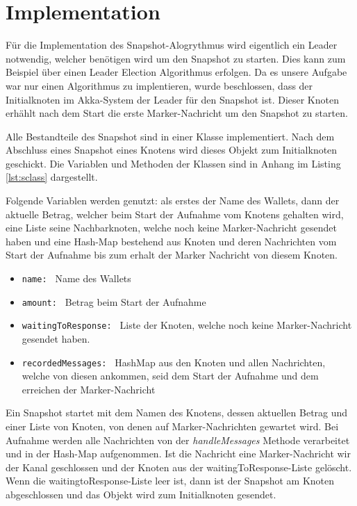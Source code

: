 \section{Implementation}
\label{sec:impl}
Für die Implementation des Snapshot-Alogrythmus wird eigentlich ein Leader 
notwendig, welcher benötigen wird um den Snapshot zu starten. Dies kann zum
Beispiel über einen Leader Election Algorithmus erfolgen. Da es unsere Aufgabe
war nur einen Algorithmus zu implentieren, wurde beschlossen, dass der 
Initialknoten im Akka-System der Leader für den Snapshot ist. Dieser Knoten 
erhählt nach dem Start die erste Marker-Nachricht um den Snapshot zu starten.

Alle Bestandteile des Snapshot sind in einer Klasse implementiert. Nach dem
Abschluss eines Snapshot eines Knotens wird dieses Objekt zum Initialknoten
geschickt.
Die Variablen und Methoden der Klassen sind in Anhang im Listing \ref{lst:sclass} 
dargestellt.

Folgende Variablen werden genutzt: als erstes der Name des Wallets, dann
der aktuelle Betrag, welcher beim Start der Aufnahme vom Knotens gehalten wird,
eine Liste seine Nachbarknoten, welche noch keine Marker-Nachricht gesendet
haben und eine Hash-Map bestehend aus Knoten und deren Nachrichten vom Start
der Aufnahme bis zum erhalt der Marker Nachricht von diesem Knoten.

\begin{itemize}
 \item \texttt{name: } Name des Wallets
 \item \texttt{amount: } Betrag beim Start der Aufnahme
 \item \texttt{waitingToResponse: } Liste der Knoten, welche noch keine 
 Marker-Nachricht gesendet haben.
 \item \texttt{recordedMessages: } HashMap aus den Knoten und allen Nachrichten, 
 welche von diesen ankommen, seid dem Start der Aufnahme und dem erreichen der
 Marker-Nachricht
\end{itemize}

Ein Snapshot startet mit dem Namen des Knotens, dessen aktuellen Betrag und 
einer Liste von Knoten, von denen auf Marker-Nachrichten gewartet wird.
Bei Aufnahme werden alle Nachrichten von der \textit{handleMessages} Methode
verarbeitet und in der Hash-Map aufgenommen.
Ist die Nachricht eine Marker-Nachricht wir der Kanal geschlossen und der
Knoten aus der waitingToResponse-Liste gelöscht.
Wenn die waitingtoResponse-Liste leer ist, dann ist der Snapshot am Knoten
abgeschlossen und das Objekt wird zum Initialknoten gesendet.

